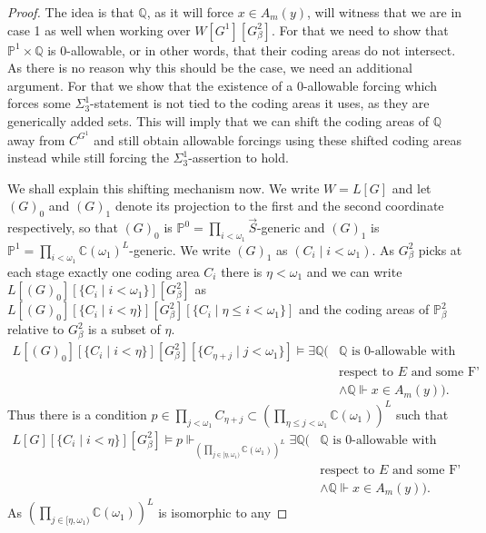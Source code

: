 \documentclass[a4paper,11pt]{article}
\newcommand{\forceP}{\mathbb{P}}
\newcommand{\forceQ}{\mathbb{Q}}
\begin{document}
\begin{proof}
The idea is that $ \forceQ$, as it will force $x \in A_m(y)$, will witness that we are in case 1 as well when working over $W[G^1][G^2_{\beta}]$. For that we need to show that $\forceP^1 \times \forceQ$ is 0-allowable, or in other words, that their coding areas do not intersect. As there is no reason why this should be the case, we need an additional argument. For that we show that the existence of a 0-allowable forcing which forces some $\Sigma^1_3$-statement is not tied to the coding areas it uses, as they are generically added sets. This will imply that we can shift the coding areas of $\forceQ$ away from $C^{G^1}$ and still obtain allowable forcings using these shifted coding areas instead while still forcing the $\Sigma^1_3$-assertion to hold.

We shall explain this shifting mechanism now. We write $W= L[G]$ and let $(G)_0$ and $(G)_1$ denote its projection to the first and the second coordinate respectively, so that $(G)_0$ is $\forceP^0= \prod_{i < \omega_1} \vec{S}$-generic and $(G)_1$ is $\forceP^1= \prod_{i < \omega_1} \mathbb{C}(\omega_1)^L$-generic. We write $(G)_1$ as $(C_i \mid i < \omega_1)$.  As $ G^2_{\beta}$ picks at each stage exactly one coding area $C_i$ there is $\eta < \omega_1$ and we can write $L[(G)_0][\{C_i \mid i < \omega_1 \}][G^2_{\beta}]$ as $L[(G)_0][\{C_i \mid i < \eta \}] [G^2_{\beta}] [\{C_i \mid \eta \le i < \omega_1 \}]$ and  the coding areas of $\forceP^2_{\beta}$ relative to $G^2_{\beta}$ is a subset of $\eta$.
\begin{align*}
L[(G)_0] [\{C_i \mid i < \eta \}] [G^2_{\beta}] [\{C_{\eta+ j} \mid j < \omega_1\} ] \models  \exists \forceQ (&\forceQ \text{ is } 0 \text{-allowable with} \\&
\text{respect to } E \text{ and some F' }  \\& \land \forceQ \Vdash {x} \in A_m({y})).
\end{align*}
Thus there is a condition $p \in \prod_{j<\omega_1} C_{\eta+j} \subset (\prod_{\eta \le j <\omega_1} \mathbb{C} (\omega_1))^L$
such that 
\begin{align*}
L[G] [\{C_i \mid i < \eta \}] [G^2_{\beta}] \models p  \Vdash_{(\prod_{j \in [\eta,\omega_1)} \mathbb{C} (\omega_1))^L}  \exists \forceQ (&\forceQ \text{ is } 0 \text{-allowable with} \\&
\text{respect to } E \text{ and some F' }  \\& \land \forceQ \Vdash {x} \in A_m({y})).
\end{align*}
As $(\prod_{j \in [\eta,\omega_1)} \mathbb{C} (\omega_1))^L$ is isomorphic to any 

\end{proof}
\end{document}
